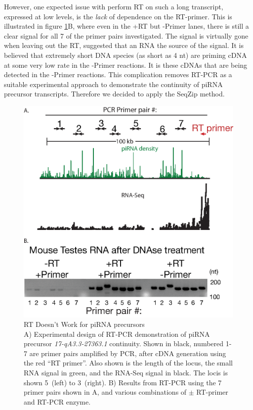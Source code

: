     However, one expected issue with perform RT on such a long transcript, expressed at low levels, is the \textit{lack} of dependence on the RT-primer. This is illustrated in figure \ref{SeqZipMethod:fig:RT doesn't work for precursors}B, where even in the +RT but -Primer lanes, there is still a clear signal for all 7 of the primer pairs investigated. The signal is virtually gone when leaving out the RT, suggested that an RNA the source of the signal. It is believed that extremely short DNA species (as short as 4 nt) are priming cDNA at some very low rate in the -Primer reactions. It is these cDNAs that are being detected in the -Primer reactions. This complication removes RT-PCR as a suitable experimental approach to demonstrate the continuity of piRNA precursor transcripts. Therefore we decided to apply the SeqZip method.

    \begin{figure} %
      \centering 
      \includegraphics{Figures/SeqZipMethod/RTDoesntWork.eps}
      \caption[pRT Doesn't Work for piRNA precursors]
      {
        RT Doesn't Work for piRNA precursors\\[0.25cm]
        A) Experimental design of RT-PCR demonstration of piRNA precursor \textit{17-qA3.3-27363.1} continuity. Shown in black, numbered 1-7 are primer pairs amplified by PCR, after cDNA generation using the red ``RT primer''. Also shown is the length of the locus, the small RNA signal in green, and the RNA-Seq signal in black. The locis is shown 5\textprime~(left) to 3\textprime~(right). B) Results from RT-PCR using the 7 primer pairs shown in A, and various combinations of $\pm$ RT-primer and RT-PCR enzyme.
      	}
      \label{SeqZipMethod:fig:RT doesn't work for precursors}
    	\end{figure}

